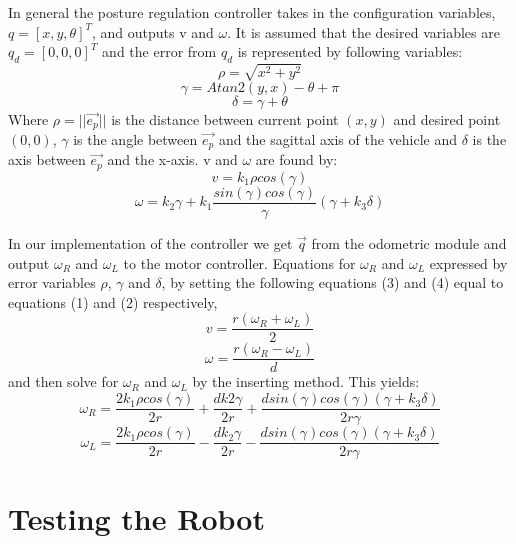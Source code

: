 \documentclass[a4paper,10pt]{article}
\begin{document}
	
		In general the posture regulation controller takes in the configuration variables, $q = [x, y, \theta]^{T}$, 
		and outputs v and $\omega$.
		It is assumed that the desired variables are $q_{d} = [0, 0, 0]^{T}$ and the error from $q_{d}$ is represented by following variables:
		\[
			\rho = \sqrt{x^{2} + y^{2}} 
		\]\[
			\gamma = Atan2(y, x) - \theta + \pi
		\]\[
			\delta = \gamma + \theta
		\]
		Where $\rho = ||\vec{e_{p}}||$ is the distance between current point $(x, y)$ and desired point $(0, 0)$, 
		$\gamma$ is the angle between $\vec{e_{p}}$	and the sagittal axis of the vehicle and $\delta$ is the axis between $\vec{e_{p}}$ and the x-axis.	
		v and $\omega$ are found by:
		\begin{equation}
			v = k_{1}\rho cos(\gamma)
		\end{equation}		
		\begin{equation}
			\omega = k_{2}\gamma + k_{1}\frac{sin(\gamma)cos(\gamma)}{\gamma}(\gamma + k_{3}\delta)
		\end{equation}
		
		In our implementation of the controller we get $\vec{q}$ from the odometric module and output $\omega_{R}$ and $\omega_{L}$ to the motor controller.
		Equations for $\omega_{R}$ and $\omega_{L}$ expressed by error variables $\rho$, $\gamma$ and $\delta$, 
		by setting the following equations (3) and (4) equal to equations (1) and (2) respectively, 
		\begin{equation}
			v = \frac{r(\omega_{R} + \omega_{L})}{2}
		\end{equation}
		\begin{equation}
			\omega = \frac{r(\omega_{R} - \omega_{L})}{d}
		\end{equation}
		and then solve for $\omega_{R}$ and $\omega_{L}$ by the inserting method. This yields:		
		\begin{equation}
			\omega_{R} = \frac{2k_{1}\rho cos(\gamma)}{2r} + \frac{dk{2}\gamma}{2r} + \frac{dsin(\gamma)cos(\gamma)(\gamma + k_{3}\delta)}{2r\gamma}
		\end{equation}
		\begin{equation}
			\omega_{L} = \frac{2k_{1}\rho cos(\gamma)}{2r} - \frac{dk_{2}\gamma}{2r} - \frac{dsin(\gamma)cos(\gamma)(\gamma + k_{3}\delta)}{2r\gamma}
		\end{equation}
		
\section*{Testing the Robot}
\end{document}
